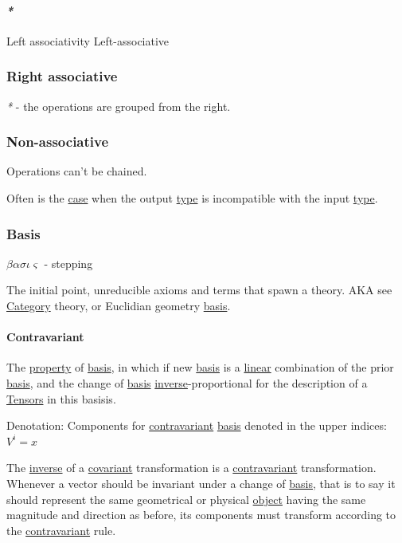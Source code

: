 \documentclass[a4paper,14pt,oneside]{book}
\begin{document}
\paragraph{\emph{*}}
\label{sec:org01815cf}

\label{org7d5a014}Left associativity
\label{org827e393}Left-associative

\subsubsection{\label{org0ef89e9}Right associative}
\label{sec:org6a43fb6}
\emph{*} - the operations are grouped from the right.

\subsubsection{\label{orga61e0a4}Non-associative}
\label{sec:orgb832545}
Operations can't be chained.

Often is the \hyperref[orga22cc9c]{case} when the output \hyperref[org1c12b47]{type} is incompatible with the input \hyperref[org1c12b47]{type}.

\subsubsection{\label{org8cd824d}Basis}
\label{sec:orgdc2a62a}
\(\beta\alpha\sigma\iota\varsigma\) - stepping

The initial point, unreducible axioms and terms that spawn a theory.
AKA see \hyperref[orge2f27c1]{Category} theory, or Euclidian geometry \hyperref[org8cd824d]{basis}.

\paragraph{\label{org4b23d60}Contravariant}
\label{sec:org37f0535}
The \hyperref[orgcd82c84]{property} of \hyperref[org8cd824d]{basis}, in which if new \hyperref[org8cd824d]{basis} is a \hyperref[org20e4130]{linear} combination of the prior \hyperref[org8cd824d]{basis}, and the change of \hyperref[org8cd824d]{basis} \hyperref[org53e50de]{inverse}-proportional for the description of a \hyperref[org4c6b45e]{Tensors} in this basisis.

Denotation:
Components for \hyperref[org4b23d60]{contravariant} \hyperref[org8cd824d]{basis} denoted in the upper indices:
\(V^{i} = x\)

The \hyperref[org53e50de]{inverse} of a \hyperref[org74bb3de]{covariant} transformation is a \hyperref[org4b23d60]{contravariant} transformation. Whenever a vector should be invariant under a change of \hyperref[org8cd824d]{basis}, that is to say it should represent the same geometrical or physical \hyperref[org0a5b612]{object} having the same magnitude and direction as before, its components must transform according to the \hyperref[org4b23d60]{contravariant} rule.
\end{document}
